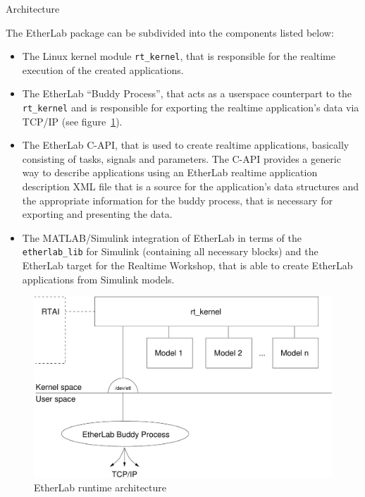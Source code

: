 \begin{ighsec}{Architecture}
\label{sec:arch}

The EtherLab package can be subdivided into the components listed below:

\begin{itemize}

\item The Linux kernel module \texttt{rt\_kernel}, that is responsible for the
realtime execution of the created applications.

\item The EtherLab ``Buddy Process'', that acts as a userspace counterpart to
the \texttt{rt\_kernel} and is responsible for exporting the realtime
application's data via TCP/IP (see figure~\ref{fig:architektur}).

\item The EtherLab C-API, that is used to create realtime applications,
basically consisting of tasks, signals and parameters. The C-API provides a
generic way to describe applications using an EtherLab realtime application
description XML file that is a source for the application's data structures
and the appropriate information for the buddy process, that is necessary for
exporting and presenting the data.

\item The MATLAB/Simulink integration of EtherLab in terms of the
\texttt{etherlab\_lib} for Simulink (containing all necessary blocks) and the
EtherLab target for the Realtime Workshop, that is able to create EtherLab
applications from Simulink models.

\end{itemize}

\begin{figure}[H]
  \begin{center}
    \includegraphics[width=\textwidth]{images/etl-arch}
    \caption{EtherLab runtime architecture}
    \label{fig:architektur}
  \end{center}
\end{figure}

\end{ighsec}

